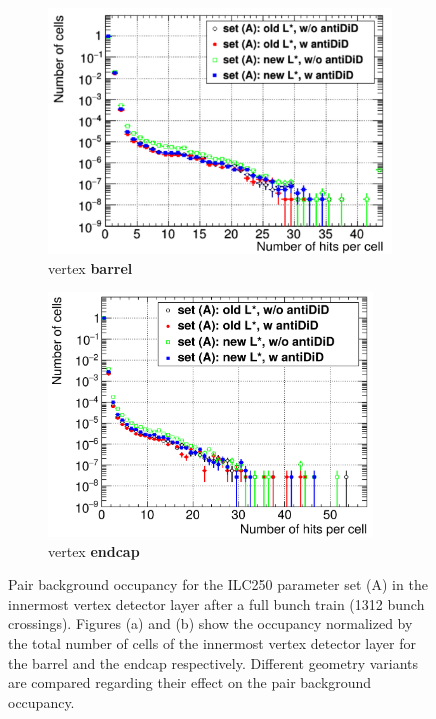  \begin{figure}
 \centering
   \begin{subfigure}[b]{0.49\textwidth}
   \centering
    \includegraphics[width=\textwidth]{Figures/Pairs/Occupancy_Comparison_Layer_0_numcells_ILC250_Comparison_Set_A_All_SiD_designs_LEG.png}
       \caption{\sid vertex \textbf{barrel}}
   \end{subfigure}
   \hfill
    \begin{subfigure}[b]{0.49\textwidth}
   \centering
    \includegraphics[width=0.945\textwidth]{Figures/Pairs/Occupancy_Comparison_Layer_0_numcells_ILC250_Comparison_Set_A_All_SiD_designs_SiVertexEndcap.png}
       \caption{\sid vertex \textbf{endcap}}
   \end{subfigure}
   \caption[Pair background occupancy in the \sid vertex detector for the ILC250 set (A) for different \sid geometry variants]{Pair background occupancy for the ILC250 parameter set (A) in the innermost \sid vertex detector layer after a full bunch train (\num{1312} bunch crossings).
   Figures (a) and (b) show the occupancy normalized by the total number of cells of the innermost vertex detector layer for the barrel and the endcap respectively.
   Different \sid geometry variants are compared regarding their effect on the pair background occupancy.
   }
   \label{fig:PairBkg:ILC250_Occupancy_SetA}
 \end{figure}

